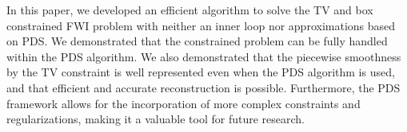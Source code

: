 In this paper, we developed an efficient algorithm to solve the TV and box constrained FWI problem with neither an inner loop nor approximations based on PDS.
We demonstrated that the constrained problem can be fully handled within the PDS algorithm.
We also demonstrated that the piecewise smoothness by the TV constraint is well represented even when the PDS algorithm is used, and that efficient and accurate reconstruction is possible.
Furthermore, the PDS framework allows for the incorporation of more complex constraints and regularizations, making it a valuable tool for future research.

